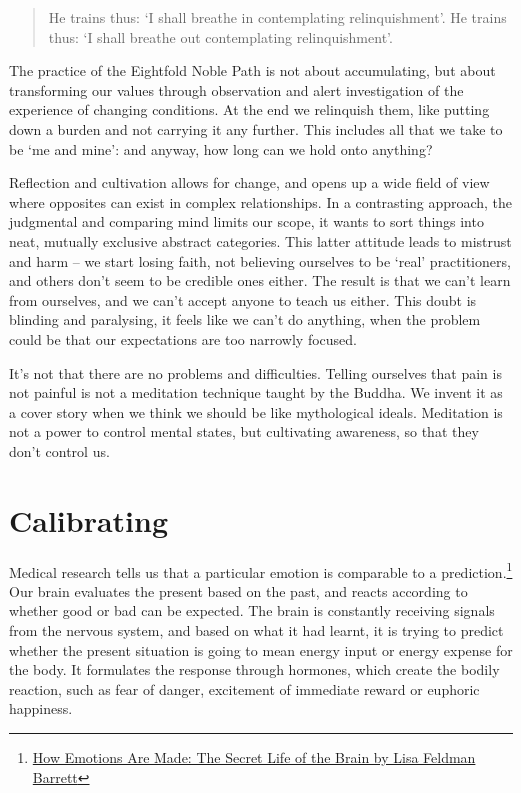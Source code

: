 \begin{quote}
He trains thus: `I shall breathe in contemplating relinquishment'. He
trains thus: `I shall breathe out contemplating relinquishment'.

\bigskip

\end{quote}

The practice of the Eightfold Noble Path is not about accumulating, but
about transforming our values through observation and alert
investigation of the experience of changing conditions. At the end we
relinquish them, like putting down a burden and not carrying it any
further. This includes all that we take to be `me and mine': and anyway,
how long can we hold onto anything?


Reflection and cultivation allows for change, and opens up a wide field
of view where opposites can exist in complex relationships. In a
contrasting approach, the judgmental and comparing mind limits our
scope, it wants to sort things into neat, mutually exclusive abstract
categories. This latter attitude leads to mistrust and harm -- we start
losing faith, not believing ourselves to be `real' practitioners, and
others don't seem to be credible ones either. The result is that we
can't learn from ourselves, and we can't accept anyone to teach us
either. This doubt is blinding and paralysing, it feels like we can't do
anything, when the problem could be that our expectations are too
narrowly focused.

It's not that there are no problems and difficulties. Telling ourselves
that pain is not painful is not a meditation technique taught by the
Buddha. We invent it as a cover story when we think we should be like
mythological ideals. Meditation is not a power to control mental states,
but cultivating awareness, so that they don't control us.

\clearpage

\section{Calibrating}


Medical research tells us that a particular emotion is comparable to a
prediction.\footnote{\href{https://www.goodreads.com/book/show/23719305-how-emotions-are-made}{How
  Emotions Are Made: The Secret Life of the Brain by Lisa Feldman
  Barrett}} Our brain evaluates the present based on the past, and
reacts according to whether good or bad can be expected. The brain is
constantly receiving signals from the nervous system, and based on what
it had learnt, it is trying to predict whether the present situation is
going to mean energy input or energy expense for the body. It formulates
the response through hormones, which create the bodily reaction, such as
fear of danger, excitement of immediate reward or euphoric happiness.

